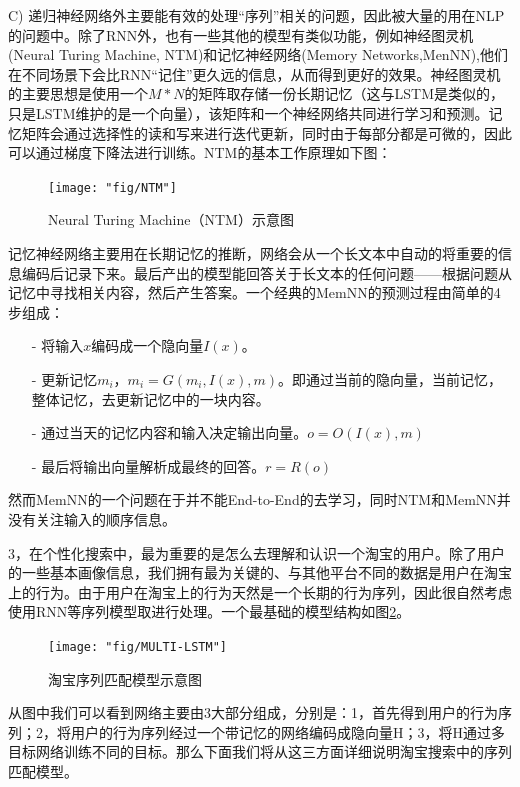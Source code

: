 C) 递归神经网络外主要能有效的处理“序列”相关的问题，因此被大量的用在NLP的问题中。除了RNN外，也有一些其他的模型有类似功能，例如神经图灵机(Neural Turing Machine, NTM\cite{7})和记忆神经网络(Memory Networks,MenNN\cite{8,9}),他们在不同场景下会比RNN“记住”更久远的信息，从而得到更好的效果。神经图灵机的主要思想是使用一个$M*N$的矩阵取存储一份长期记忆（这与LSTM是类似的，只是LSTM维护的是一个向量），该矩阵和一个神经网络共同进行学习和预测。记忆矩阵会通过选择性的读和写来进行迭代更新，同时由于每部分都是可微的，因此可以通过梯度下降法进行训练。NTM的基本工作原理如下图：

\begin{figure}[h]
	\centering
	\texttt{[image: "fig/NTM"]}
	\caption{Neural Turing Machine（NTM）示意图}
	\label{fig:NTM}
\end{figure}

记忆神经网络\cite{8}主要用在长期记忆的推断，网络会从一个长文本中自动的将重要的信息编码后记录下来。最后产出的模型能回答关于长文本的任何问题——根据问题从记忆中寻找相关内容，然后产生答案。一个经典的MemNN的预测过程由简单的4步组成：
\begin{itemize}
	\item[-] 将输入$x$编码成一个隐向量$I(x)$。
	\item[-] 更新记忆$m_i$，$m_i=G(m_i, I(x), m)$。即通过当前的隐向量，当前记忆，整体记忆，去更新记忆中的一块内容。
	\item[-] 通过当天的记忆内容和输入决定输出向量。$o = O(I(x),m)$
	\item[-] 最后将输出向量解析成最终的回答。$r = R(o)$
\end{itemize}
然而MemNN的一个问题在于并不能End-to-End的去学习，同时NTM和MemNN并没有关注输入的顺序信息。

3，在个性化搜索中，最为重要的是怎么去理解和认识一个淘宝的用户。除了用户的一些基本画像信息，我们拥有最为关键的、与其他平台不同的数据是用户在淘宝上的行为。由于用户在淘宝上的行为天然是一个长期的行为序列，因此很自然考虑使用RNN等序列模型取进行处理。一个最基础的模型结构如图\ref{fig:MULTI-LSTM}。

\begin{figure}[h]
	\centering
	\texttt{[image: "fig/MULTI-LSTM"]}
	\caption{淘宝序列匹配模型示意图}
	\label{fig:MULTI-LSTM}
\end{figure}

从图中我们可以看到网络主要由3大部分组成，分别是：1，首先得到用户的行为序列；2，将用户的行为序列经过一个带记忆的网络编码成隐向量H；3，将H通过多目标网络训练不同的目标。那么下面我们将从这三方面详细说明淘宝搜索中的序列匹配模型。

